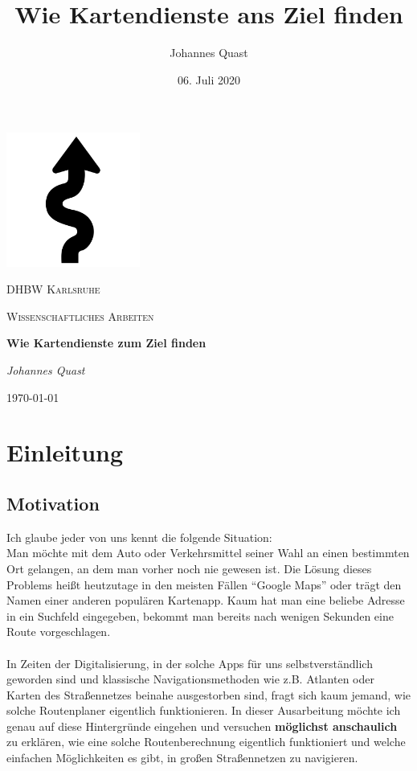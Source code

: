 \documentclass[11pt]{scrreprt}
\title{Wie Kartendienste ans Ziel finden}
\date{06. Juli 2020}
\author{Johannes Quast}
\begin{document}
\begin{titlepage}
	\centering
	\includegraphics[width=0.33\textwidth]{Bilder/Arrow}\par\vspace{1cm}
	{\scshape\LARGE DHBW Karlsruhe \par}
	\vspace{1cm}
	{\scshape\Large Wissenschaftliches Arbeiten\par}
	\vspace{1.5cm}
	{\huge\bfseries Wie Kartendienste zum Ziel finden\par}
	\vspace{2cm}
	{\Large\itshape Johannes Quast\par}
	
	\vfill
	
	{\large \today\par}
\end{titlepage}

\tableofcontents

\chapter{Einleitung}
	\section{Motivation}
	Ich glaube jeder von uns kennt die folgende Situation: \\
	Man möchte mit dem Auto oder Verkehrsmittel seiner Wahl an einen bestimmten Ort gelangen, an dem man vorher noch nie gewesen ist.
	Die Lösung dieses Problems heißt heutzutage in den meisten Fällen \enquote{Google Maps} oder trägt den Namen einer anderen populären Kartenapp.
	Kaum hat man eine beliebe Adresse in ein Suchfeld eingegeben, bekommt man bereits nach wenigen Sekunden eine Route vorgeschlagen.
	\\\\
	In Zeiten der Digitalisierung, in der solche Apps für uns selbstverständlich geworden sind und klassische Navigationsmethoden wie z.B. Atlanten oder Karten des Straßennetzes beinahe ausgestorben sind, fragt sich kaum jemand, wie solche Routenplaner eigentlich funktionieren.
	In dieser Ausarbeitung möchte ich genau auf diese Hintergründe eingehen und versuchen \textbf{möglichst anschaulich} zu erklären, wie eine solche Routenberechnung eigentlich funktioniert und welche einfachen Möglichkeiten es gibt, in großen Straßennetzen zu navigieren.
\end{document}
